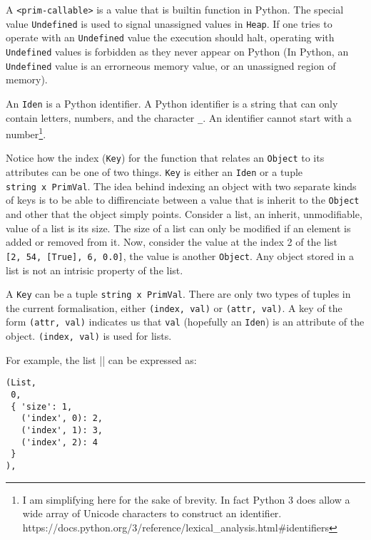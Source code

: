 A \texttt{\textless{}prim-callable\textgreater{}} is a value that is
builtin function in Python. The special value \texttt{Undefined} is used
to signal unassigned values in \texttt{Heap}. If one tries to operate
with an \texttt{Undefined} value the execution should halt, operating
with \texttt{Undefined} values is forbidden as they never appear on
Python (In Python, an \texttt{Undefined} value is an errorneous memory
value, or an unassigned region of memory).

An \texttt{Iden} is a Python identifier. A Python identifier is a string
that can only contain letters, numbers, and the character \texttt{\_}.
An identifier cannot start with a number\footnote{I am simplifying here
  for the sake of brevity. In fact Python 3 does allow a wide array of
  Unicode characters to construct an identifier.
  https://docs.python.org/3/reference/lexical\_analysis.html\#identifiers}.

Notice how the index (\texttt{Key}) for the function that relates an
\texttt{Object} to its attributes can be one of two things. \texttt{Key}
is either an \texttt{Iden} or a tuple \texttt{string\ x\ PrimVal}. The
idea behind indexing an object with two separate kinds of keys is to be
able to diffirenciate between a value that is inherit to the
\texttt{Object} and other that the object simply points. Consider a
list, an inherit, unmodifiable, value of a list is its size. The size of
a list can only be modified if an element is added or removed from it.
Now, consider the value at the index 2 of the list
\texttt{{[}2,\ 54,\ {[}True{]},\ 6,\ 0.0{]}}, the value is another
\texttt{Object}. Any object stored in a list is not an intrisic property
of the list.

A \texttt{Key} can be a tuple \texttt{string\ x\ PrimVal}. There are
only two types of tuples in the current formalisation, either
\texttt{(\textquotesingle{}index\textquotesingle{},\ val)} or
\texttt{(\textquotesingle{}attr\textquotesingle{},\ val)}. A key of the
form \texttt{(\textquotesingle{}attr\textquotesingle{},\ val)} indicates
us that \texttt{val} (hopefully an \texttt{Iden}) is an attribute of the
object. \texttt{(\textquotesingle{}index\textquotesingle{},\ val)} is
used for lists.

For example, the list
\VERB|\NormalTok{[}\NormalTok{, }\NormalTok{, ()]}|
can be expressed as:

\begin{verbatim}
(List,
 0,
 { 'size': 1,
   ('index', 0): 2,
   ('index', 1): 3,
   ('index', 2): 4
 }
),
\end{verbatim}

